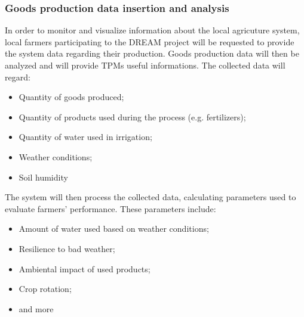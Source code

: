 \documentclass[10pt]{article}
\begin{document}
\subsubsection{Goods production data insertion and analysis}
In order to monitor and visualize information about the local agricuture system, local farmers participating to the DREAM project 
will be requested to provide the system data regarding their production. Goods production data will then be analyzed and will provide TPMs 
useful informations. 
The collected data will regard:
\begin{itemize}
    \item Quantity of goods produced;
    \item Quantity of products used during the process (e.g. fertilizers);
    \item Quantity of water used in irrigation;
    \item Weather conditions;
    \item Soil humidity
\end{itemize}
The system will then process the collected data, calculating parameters used to evaluate farmers' performance. These parameters include:
\begin{itemize}
    \item Amount of water used based on weather conditions;
    \item Resilience to bad weather;
    \item Ambiental impact of used products;
    \item Crop rotation;
    \item and more %
\end{itemize}
\end{document}
